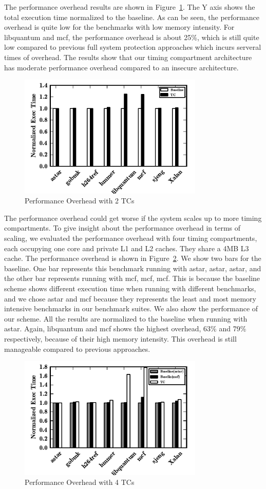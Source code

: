 The performance overhead results are shown in Figure~\ref{fig:performance}. The Y axis shows the total
execution time normalized to the baseline. As can be seen, the performance overhead is quite low
for the benchmarks with low memory intensity. For libquantum and mcf, the performance overhead is about 
25\%, which is still quite low compared to previous full system protection approaches which incurs serveral
times of overhead. The results show that our timing compartment architecture has moderate performance overhead
compared to an insecure architecture.

\begin{figure}
    \begin{center}
        \includegraphics[width=3.46in]{figs/performance.pdf}
        \caption{Performance Overhead with 2 TCs}
        \label{fig:performance}
    \end{center}
\end{figure}

The performance overhead could get worse if the system scales up to more timing compartments. To give insight
about the performance overhead in terms of scaling, we evaluated the performance overhead with four timing
compartments, each occupying one core and private L1 and L2 caches. They share a 4MB L3 cache. The performance
overhead is shown in Figure~\ref{fig:scalability}. We show two bars for the baseline. One bar represents this
benchmark running with {astar, astar, astar}, and the other bar represents running with {mcf, mcf, mcf}. This
is because the baseline scheme shows different execution time when running with different benchmarks, and we
chose astar and mcf because they represents the least and most memory intensive benchmarks in our benchmark
suites. We also show the performance of our scheme. All the results are normalized to the baseline when running
with astar. Again, libquantum and mcf shows the highest overhead, 63\% and 79\% respectively, because of their 
high memory intensity. This overhead is still manageable compared to previous approaches.

\begin{figure}
    \begin{center}
        \includegraphics[width=3.46in]{figs/scalability.pdf}
        \caption{Performance Overhead with 4 TCs}
        \label{fig:scalability}
    \end{center}
\end{figure}


